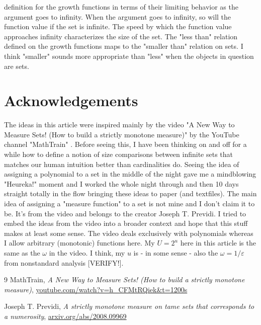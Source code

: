 \documentclass[12pt]{article}
\begin{document}
definition for the growth functions in terms of their limiting behavior as the argument goes to infinity. When the argument goes to infinity, so will the function value if the set is infinite. The speed by which the function value approaches infinity characterizes the size of the set. The "less than" relation defined on the growth functions maps to the "smaller than" relation on sets. I think "smaller" sounds more appropriate than "less" when the objects in question are sets.

\section{Acknowledgements}
The ideas in this article were inspired mainly by the video "A New Way to Measure Sets! (How to build a strictly monotone measure)" by the YouTube channel "MathTrain" \cite{MathTrain1}. Before seeing this, I have been thinking on and off for a while how to define a notion of size comparisons between infinite sets that matches our human intuition better than cardinalities do. Seeing the idea of assigning a polynomial to a set in the middle of the night gave me a mindblowing "Heureka!" moment and I worked the whole night through and then 10 days straight totally in the flow bringing these ideas to paper (and textfiles). The main idea of assigning a "measure function" to a set is not mine and I don't claim it to be. It's from the video and belongs to the creator Joseph T. Previdi. I tried to embed the ideas from the video into a broader context and hope that this stuff makes at least some sense. The video deals exclusively with polynomials whereas I allow arbitrary (monotonic) functions here. My $U = 2^u$ here in this article is the same as the $\omega$ in the video. I think, my $u$ is - in some sense - also the $\omega = 1/\varepsilon$ from nonstandard analysis [VERIFY!].


%

\begin{thebibliography}{9}
MathTrain,
\textit{A New Way to Measure Sets! (How to build a strictly monotone measure)},
\href{https://www.youtube.com/watch?v=h_CFMtRQiek&t=1200s}{youtube.com/watch?v=h\_CFMtRQiek\&t=1200s} 

 Joseph T. Previdi,
 \textit{A strictly monotone measure on tame sets that corresponds to a numerosity},
 \href{https://arxiv.org/abs/2008.09969}{arxiv.org/abs/2008.09969}
\end{thebibliography}
 
\end{document}
